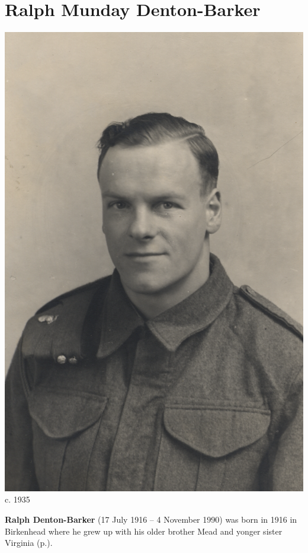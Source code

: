 \section{Ralph Munday Denton-Barker}\label{Ralph_Munday_Denton-Barker}

\begin{center}
\includegraphics[width=0.8\linewidth]{photos/Ralph_Munday_Denton-Barker} \\
{\footnotesize c. 1935\cite{FlickrTeachers}}
\end{center}

\textbf{Ralph Denton-Barker} (17 July 1916 -- 4 November 1990) was born in 1916 in Birkenhead \cite{BMDIndex_RalphMundayDentonBarker_birth} where he grew up with his older brother Mead and yonger sister Virginia (p.\pageref{Virginia_Kathleen_Denton_Barker}).

